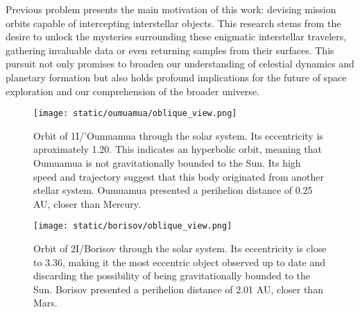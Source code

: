 Previous problem presents the main motivation of this work: devising mission
orbits capable of intercepting interstellar objects. This research stems from
the desire to unlock the mysteries surrounding these enigmatic interstellar
travelers, gathering invaluable data or even returning samples from their
surfaces. This pursuit not only promises to broaden our understanding of
celestial dynamics and planetary formation but also holds profound implications
for the future of space exploration and our comprehension of the broader
universe.

\newpage
\begin{figure}[H]
  \centering
  \texttt{[image: static/oumuamua/oblique\_view.png]}
  \caption[Orbit of 1I/'Oumuamua through the solar system]{
    Orbit of 1I/'Oumuamua through the solar system. Its eccentricity is
    aproximately 1.20. This indicates an hyperbolic orbit, meaning that
    Oumuamua is not gravitationally bounded to the Sun. Its high speed and
    trajectory suggest that this body originated from another stellar system.
    Oumuamua presented a perihelion distance of 0.25 AU, closer than Mercury.
  }
  \label{fig:oumuamua_orbit}
\end{figure}

\begin{figure}[H]
  \centering
  \texttt{[image: static/borisov/oblique\_view.png]}
  \caption[Orbit of 2I/Borisov through the solar system]{
    Orbit of 2I/Borisov through the solar system. Its eccentricity is
    close to 3.36, making it the most eccentric object observed up to date
    and discarding the possibility of being gravitationally bounded to the Sun.
    Borisov presented a perihelion distance of 2.01 AU, closer than Mars.
  }
  \label{fig:borisov_orbit}
\end{figure}
